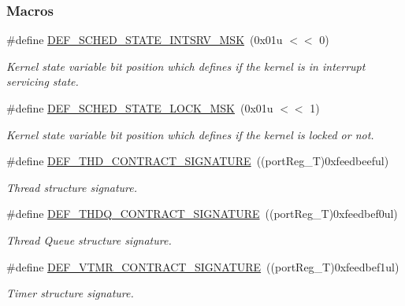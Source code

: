 \subsubsection*{Macros}
\begin{DoxyCompactItemize}
\item 
\#define \hyperlink{group__kern__impl_ga8558d079ebfe8a9af11fc796d46d9ab5}{D\-E\-F\-\_\-\-S\-C\-H\-E\-D\-\_\-\-S\-T\-A\-T\-E\-\_\-\-I\-N\-T\-S\-R\-V\-\_\-\-M\-S\-K}~(0x01u $<$$<$ 0)
\begin{DoxyCompactList}\small\item\em Kernel state variable bit position which defines if the kernel is in interrupt servicing state. \end{DoxyCompactList}\item 
\#define \hyperlink{group__kern__impl_gaaf8217f5d1bfca8caecc2206fa74abc7}{D\-E\-F\-\_\-\-S\-C\-H\-E\-D\-\_\-\-S\-T\-A\-T\-E\-\_\-\-L\-O\-C\-K\-\_\-\-M\-S\-K}~(0x01u $<$$<$ 1)
\begin{DoxyCompactList}\small\item\em Kernel state variable bit position which defines if the kernel is locked or not. \end{DoxyCompactList}\item 
\#define \hyperlink{group__kern__impl_ga19da32f7a4f44e5a4bddb5a588d73677}{D\-E\-F\-\_\-\-T\-H\-D\-\_\-\-C\-O\-N\-T\-R\-A\-C\-T\-\_\-\-S\-I\-G\-N\-A\-T\-U\-R\-E}~((port\-Reg\-\_\-\-T)0xfeedbeeful)
\begin{DoxyCompactList}\small\item\em Thread structure signature. \end{DoxyCompactList}\item 
\#define \hyperlink{group__kern__impl_ga7f087a59efb2fe7078a7479aa674b7b4}{D\-E\-F\-\_\-\-T\-H\-D\-Q\-\_\-\-C\-O\-N\-T\-R\-A\-C\-T\-\_\-\-S\-I\-G\-N\-A\-T\-U\-R\-E}~((port\-Reg\-\_\-\-T)0xfeedbef0ul)
\begin{DoxyCompactList}\small\item\em Thread Queue structure signature. \end{DoxyCompactList}\item 
\#define \hyperlink{group__kern__impl_gaed6b30b1e098b37a398f58e2a5b73b8b}{D\-E\-F\-\_\-\-V\-T\-M\-R\-\_\-\-C\-O\-N\-T\-R\-A\-C\-T\-\_\-\-S\-I\-G\-N\-A\-T\-U\-R\-E}~((port\-Reg\-\_\-\-T)0xfeedbef1ul)
\begin{DoxyCompactList}\small\item\em Timer structure signature. \end{DoxyCompactList}\item 

\end{DoxyCompactItemize}
